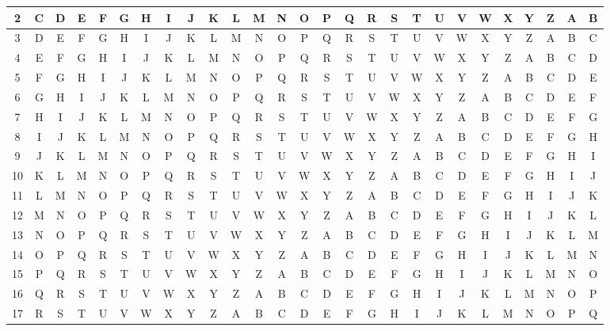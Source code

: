 \documentclass[12pt]{article}
\begin{document}
\begin{enumerate}
\begin{table}[h]
{\begin{tabular}{|c|c|c|c|c|c|c|c|c|c|c|c|c|c|c|c|c|c|c|c|c|c|c|c|c|c|c|}
				\hline
				2 & C & D & E & F & G & H & I & J & K & L & M & N & O & P & Q & R & S & T & U & V & W & X & Y & Z & A & B\\
				\hline
				3 & D & E & F & G & H & I & J & K & L & M & N & O & P & Q & R & S & T & U & V & W & X & Y & Z & A & B & C\\
				\hline
				4 & E & F & G & H & I & J & K & L & M & N & O & P & Q & R & S & T & U & V & W & X & Y & Z & A & B & C & D\\
				\hline
				5 & F & G & H & I & J & K & L & M & N & O & P & Q & R & S & T & U & V & W & X & Y & Z & A & B & C & D & E\\
				\hline
				6 & G & H & I & J & K & L & M & N & O & P & Q & R & S & T & U & V & W & X & Y & Z & A & B & C & D & E & F\\
				\hline
				7 & H & I & J & K & L & M & N & O & P & Q & R & S & T & U & V & W & X & Y & Z & A & B & C & D & E & F & G\\
				\hline
				8 & I & J & K & L & M & N & O & P & Q & R & S & T & U & V & W & X & Y & Z & A & B & C & D & E & F & G & H\\
				\hline
				9 & J & K & L & M & N & O & P & Q & R & S & T & U & V & W & X & Y & Z & A & B & C & D & E & F & G & H & I\\
				\hline
				10 & K & L & M & N & O & P & Q & R & S & T & U & V & W & X & Y & Z & A & B & C & D & E & F & G & H & I & J\\
				\hline
				11 & L & M & N & O & P & Q & R & S & T & U & V & W & X & Y & Z & A & B & C & D & E & F & G & H & I & J & K\\
				\hline
				12 & M & N & O & P & Q & R & S & T & U & V & W & X & Y & Z & A & B & C & D & E & F & G & H & I & J & K & L\\
				\hline
				13 & N & O & P & Q & R & S & T & U & V & W & X & Y & Z & A & B & C & D & E & F & G & H & I & J & K & L & M\\
				\hline
				14 & O & P & Q & R & S & T & U & V & W & X & Y & Z & A & B & C & D & E & F & G & H & I & J & K & L & M & N\\
				\hline
				15 & P & Q & R & S & T & U & V & W & X & Y & Z & A & B & C & D & E & F & G & H & I & J & K & L & M & N & O\\
				\hline
				16 & Q & R & S & T & U & V & W & X & Y & Z & A & B & C & D & E & F & G & H & I & J & K & L & M & N & O & P\\
				\hline
				17 & R & S & T & U & V & W & X & Y & Z & A & B & C & D & E & F & G & H & I & J & K & L & M & N & O & P & Q\\

\end{tabular}}
\end{table}
\end{enumerate}
\end{document}
